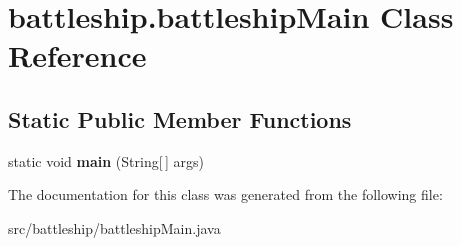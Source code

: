 \hypertarget{classbattleship_1_1battleshipMain}{}\section{battleship.\+battleship\+Main Class Reference}
\label{classbattleship_1_1battleshipMain}
\subsection*{Static Public Member Functions}
\begin{DoxyCompactItemize}
\item 
\hypertarget{classbattleship_1_1battleshipMain_ae9d96ca5cdeeee799e97078d59c8d59a}{}static void {\bfseries main} (String\mbox{[}$\,$\mbox{]} args)\label{classbattleship_1_1battleshipMain_ae9d96ca5cdeeee799e97078d59c8d59a}

\end{DoxyCompactItemize}


The documentation for this class was generated from the following file\+:\begin{DoxyCompactItemize}
\item 
src/battleship/battleship\+Main.\+java\end{DoxyCompactItemize}
